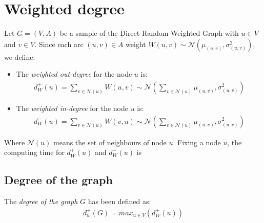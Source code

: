 \section{Weighted degree}
Let $G=(V,A)$ be a sample of the Direct Random Weighted Graph with $u\in V$ and $v\in V$. Since each arc $(u,v)\in A$ weight $ W(u, v) \sim \mathcal{N}(\mu_{(u, v)}, \sigma^2_{(u, v)}) $, we define:
\begin{itemize}
	\item The \textit{weighted out-degree} for the node $u$ is:
	\begin{align*}
		d_W^+(u) = \sum_{v \in \mathcal{N}(u)} W(u, v) \sim \mathcal{N}(\sum_{v \in \mathcal{N}(u)} \mu_{(u, v)}, \sigma^2_{(u, v)})
	\end{align*}
	\item The \textit{weighted in-degree} for the node $u$ is:
	\begin{align*}
		d_W^-(u) = \sum_{v \in \mathcal{N}(u)} W(v, u) \sim \mathcal{N}(\sum_{v \in \mathcal{N}(u)} \mu_{(u, v)}, \sigma^2_{(u, v)})
	\end{align*}
\end{itemize}

Where $\mathcal{N}(u)$ means the set of neighbours of node $u$.
Fixing a node $u$, the computing time for $d_W^+(u)$ and $d_W^-(u)$ is 

\subsection{Degree of the graph}
The \textit{degree of the graph} $G$ has been defined as:
\begin{align*}
	d^+_w(G) = max_{u\in V}(d_W^+(u))
\end{align*}


